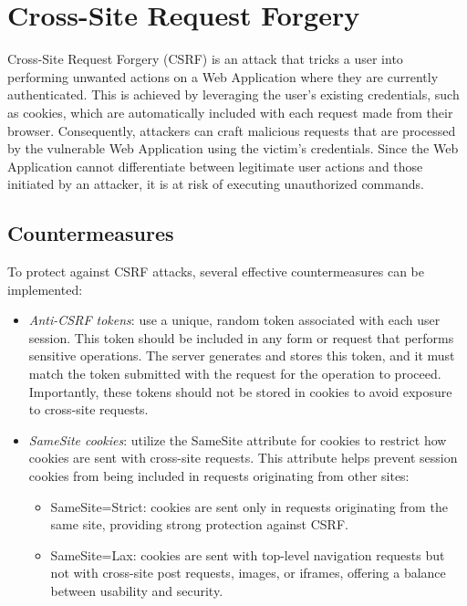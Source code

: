 \section{Cross-Site Request Forgery}

Cross-Site Request Forgery (CSRF) is an attack that tricks a user into performing unwanted actions on a Web Application where they are currently authenticated. 
This is achieved by leveraging the user's existing credentials, such as cookies, which are automatically included with each request made from their browser. 
Consequently, attackers can craft malicious requests that are processed by the vulnerable Web Application using the victim's credentials. 
Since the Web Application cannot differentiate between legitimate user actions and those initiated by an attacker, it is at risk of executing unauthorized commands.

\subsection{Countermeasures}
To protect against CSRF attacks, several effective countermeasures can be implemented:
\begin{itemize}
    \item \textit{Anti-CSRF tokens}: use a unique, random token associated with each user session. 
        This token should be included in any form or request that performs sensitive operations. 
        The server generates and stores this token, and it must match the token submitted with the request for the operation to proceed. 
        Importantly, these tokens should not be stored in cookies to avoid exposure to cross-site requests.
    \item \textit{SameSite cookies}: utilize the SameSite attribute for cookies to restrict how cookies are sent with cross-site requests. 
        This attribute helps prevent session cookies from being included in requests originating from other sites:
        \begin{itemize}
            \item SameSite=Strict: cookies are sent only in requests originating from the same site, providing strong protection against CSRF.
            \item SameSite=Lax: cookies are sent with top-level navigation requests but not with cross-site post requests, images, or iframes, offering a balance between usability and security.
        \end{itemize}
\end{itemize}
